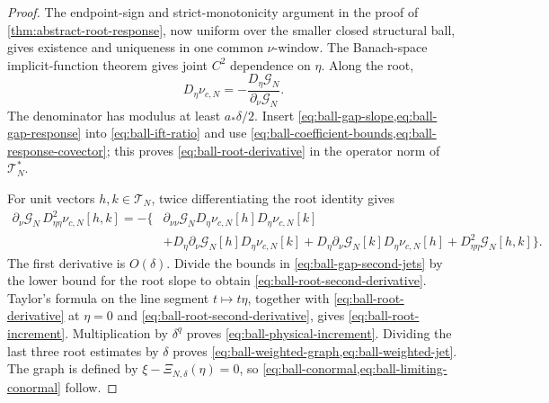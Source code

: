 \begin{proof}
The endpoint-sign and strict-monotonicity argument in the proof of
\cref{thm:abstract-root-response}, now uniform over the smaller closed
structural ball, gives existence and uniqueness in one common
\(\nu\)-window.  The Banach-space implicit-function theorem gives joint
\(C^2\) dependence on \(\eta\).  Along the root,
\begin{equation}
 D_\eta\nu_{c,N}
 =-\frac{D_\eta\mathscr G_N}{\partial_\nu\mathscr G_N}.         \label{eq:ball-ift-ratio}
\end{equation}
The denominator has modulus at least \(a_*\delta/2\).  Insert
\cref{eq:ball-gap-slope,eq:ball-gap-response} into
\cref{eq:ball-ift-ratio} and use
\cref{eq:ball-coefficient-bounds,eq:ball-response-covector}; this proves
\cref{eq:ball-root-derivative} in the operator norm of
\(\mathcal T_N^*\).

For unit vectors \(h,k\in\mathcal T_N\), twice differentiating the root
identity gives
\begin{align*}
 \partial_\nu\mathscr G_N\,
       D_{\eta\eta}^2\nu_{c,N}[h,k]
 =-\{&\partial_{\nu\nu}\mathscr G_N
       D_\eta\nu_{c,N}[h]D_\eta\nu_{c,N}[k]\\
 &+D_\eta\partial_\nu\mathscr G_N[h]
       D_\eta\nu_{c,N}[k]
  +D_\eta\partial_\nu\mathscr G_N[k]
       D_\eta\nu_{c,N}[h]
  +D_{\eta\eta}^2\mathscr G_N[h,k]\}.
\end{align*}
The first derivative is \(O(\delta)\).  Divide the bounds in
\cref{eq:ball-gap-second-jets} by the lower bound for the root slope to
obtain \cref{eq:ball-root-second-derivative}.  Taylor's formula on the line
segment \(t\mapsto t\eta\), together with
\cref{eq:ball-root-derivative} at \(\eta=0\) and
\cref{eq:ball-root-second-derivative}, gives
\cref{eq:ball-root-increment}.  Multiplication by \(\delta^q\) proves
\cref{eq:ball-physical-increment}.  Dividing the last three root estimates
by \(\delta\) proves
\cref{eq:ball-weighted-graph,eq:ball-weighted-jet}.  The graph is defined by
\(\xi-\Xi_{N,\delta}(\eta)=0\), so
\cref{eq:ball-conormal,eq:ball-limiting-conormal} follow.
\end{proof}


